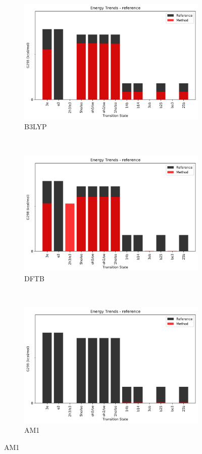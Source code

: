 \documentclass{article}
\begin{document}
\begin{figure}[H]
	\begin{subfigure}[b]{0.3\textwidth}
		\includegraphics[width=1\textwidth,keepaspectratio]
		{figures/oxane/comp_tables/oxane-diff-trend-b3lyp.png}
		\caption{B3LYP}
	\end{subfigure}
	~
	\begin{subfigure}[b]{0.3\textwidth}
		\includegraphics[width=1\textwidth,keepaspectratio]
		{figures/oxane/comp_tables/oxane-diff-trend-dftb.png}
		\caption{DFTB}
	\end{subfigure}
	~
	\begin{subfigure}[b]{0.3\textwidth}
		\includegraphics[width=1\textwidth,keepaspectratio]
		{figures/oxane/comp_tables/oxane-diff-trend-am1.png}
		\caption{AM1}
	\end{subfigure}
	

\end{figure}
\end{document}
